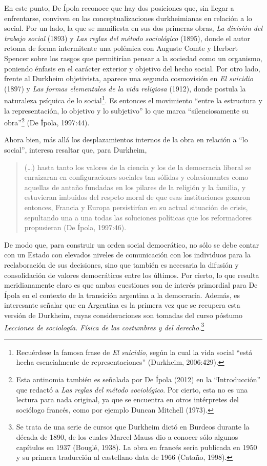 En este punto, De Ípola reconoce que hay dos posiciones que, sin llegar a enfrentarse, conviven en las conceptualizaciones durkheimianas en relación a lo social. Por un lado, la que se manifiesta en sus dos primeras obras, \emph{La división del trabajo social} (1893) y \emph{Las reglas del método sociológico} (1895), donde el autor retoma de forma intermitente una polémica con Auguste Comte y Herbert Spencer sobre los rasgos que permitirían pensar a la sociedad como un organismo, poniendo énfasis en el carácter exterior y objetivo del hecho social. Por otro lado, frente al Durkheim objetivista, aparece una segunda cosmovisión en \emph{El suicidio} (1897) y \emph{Las formas elementales de la vida religiosa} (1912), donde postula la naturaleza psíquica de lo social\footnote{Recuérdese la famosa frase de \emph{El suicidio}, según la cual la vida social ``está hecha esencialmente de representaciones'' (Durkheim, 2006:429).}. Es entonces el movimiento ``entre la estructura y la representación, lo objetivo y lo subjetivo'' lo que marca ``silenciosamente su obra''\footnote{Esta antinomia también es señalada por De Ípola (2012) en la ``Introducción'' que redactó a \emph{Las reglas del método sociológico}. Por cierto, esta no es una lectura para nada original, ya que se encuentra en otros intérpretes del sociólogo francés, como por ejemplo Duncan Mitchell (1973).} (De Ípola, 1997:44).

Ahora bien, más allá los desplazamientos internos de la obra en relación a ``lo social'', interesa resaltar que, para Durkheim,

\begin{quote}
(\ldots) hasta tanto los valores de la ciencia y los de la democracia liberal se enraizaran en configuraciones sociales tan sólidas y cohesionantes como aquellas de antaño fundadas en los pilares de la religión y la familia, y estuvieran imbuidos del respeto moral de que esas instituciones gozaron entonces, Francia y Europa persistirían en su actual situación de crisis, sepultando una a una todas las soluciones políticas que los reformadores propusieran (De Ípola, 1997:46).
\end{quote}

De modo que, para construir un orden social democrático, no sólo se debe contar con un Estado con elevados niveles de comunicación con los individuos para la reelaboración de sus decisiones, sino que también es necesaria la difusión y consolidación de valores democráticos entre los últimos. Por cierto, lo que resulta meridianamente claro es que ambas cuestiones son de interés primordial para De Ípola en el contexto de la transición argentina a la democracia. Además, es interesante señalar que en Argentina es la primera vez que se recupera esta versión de Durkheim, cuyas consideraciones son tomadas del curso póstumo \emph{Lecciones de sociología. Física de las costumbres y del derecho.}\footnote{Se trata de una serie de cursos que Durkheim dictó en Burdeos durante la década de 1890, de los cuales Marcel Mauss dio a conocer sólo algunos capítulos en 1937 (Bouglé, 1938). La obra en francés sería publicada en 1950 y su primera traducción al castellano data de 1966 (Cataño, 1998).}

